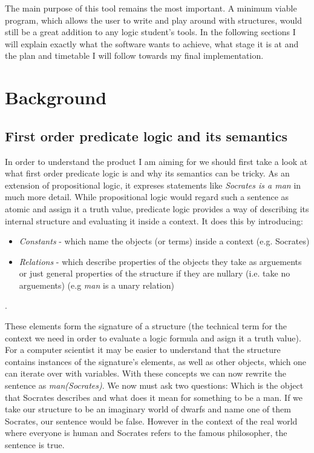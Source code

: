 \documentclass{article}
\begin{document}
\noindent The main purpose of this tool remains the most important. A minimum viable program, which allows the user to write and play around with structures, would still be a great addition to any logic student's tools. In the following sections I will explain exactly what the software wants to achieve, what stage it is at and the plan and timetable I will follow towards my final implementation.

\section{Background}

\subsection{First order predicate logic and its semantics}

In order to understand the product I am aiming for we should first take a look at what first order predicate logic is and why its semantics can be tricky. As an extension of propositional logic, it expreses statements like \emph{Socrates is a man} in much more detail. While propositional logic would regard such a sentence as atomic and assign it a truth value, predicate logic provides a way of describing its internal structure and evaluating it inside a context. It does this by introducing:

	\begin{itemize}
	\item \emph{Constants} - which name the objects (or terms) inside a context (e.g. Socrates)
	\item \emph{Relations} - which describe properties of the objects they take as arguements or just general properties of the structure if they are nullary (i.e. take no arguements) (e.g \emph{man} is a unary relation)
	\end{itemize}.

\noindent These elements form the signature of a structure (the technical term for the context we need in order to evaluate a logic formula and asign it a truth value). For a computer scientist it may be easier to understand that the structure contains instances of the signature's elements, as well as other objects, which one can iterate over with variables. With these concepts we can now rewrite the sentence as \emph{man(Socrates)}. We now must ask two questions: Which is the object that Socrates describes and what does it mean for something to be a man. If we take our structure to be an imaginary world of dwarfs and name one of them Socrates, our sentence would be false. However in the context of the real world where everyone is human and Socrates refers to the famous philosopher, the sentence is true.\\
\end{document}
